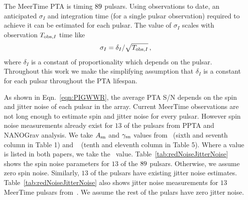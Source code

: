 
The MeerTime PTA is timing $89$ pulsars.
Using observations to date, an anticipated $\sigma_I$ and integration time (for a single pulsar observation) required to achieve it can be estimated for each pulsar.
The value of $\sigma_I$ scales with observation $T_{{\rm obs},I}$ time like 
\begin{equation}
\sigma_I = \delta_I / \sqrt{T_{{\rm obs},I}}\,,
\label{eqn:TobsToSig}
\end{equation}
where $\delta_I$ is a constant of proportionality which depends on the pulsar. 
Throughout this work we make the simplifying assumption that $\delta_I$ is a constant for each pulsar throughout the PTA lifespan.

As shown in Eqn.~\ref{eqn:PIGWWR}, the average PTA S/N depends on the spin and jitter noise of each pulsar in the array.
Current MeerTime observations are not long enough to estimate spin and jitter noise for every pulsar.
However spin noise measurements already exist for $13$ of the pulsars from PPTA and NANOGrav analysis. 
We take $A_{\rm sn}$ and $\gamma_{\rm sn}$ values from~\cite{GoncharovEtAl:2021} (sixth and seventh column in Table 1) and ~\cite{NANOGrav12p5yr:2021} (tenth and eleventh column in Table 5). 
Where a value is listed in both papers, we take the~\cite{GoncharovEtAl:2021} value. 
Table~\ref{tab:redNoiseJitterNoise} shows the spin noise parameters for $13$ of the $89$ pulsars. 
Otherwise, we assume zero spin noise. 
Similarly, $13$ of the pulsars have existing jitter noise estimates. 
Table~\ref{tab:redNoiseJitterNoise} also shows jitter noise measurements for $13$ MeerTime pulsars from~\cite{ParthasarathyEtAl:2021}.
We assume the rest of the pulars have zero jitter noise.

